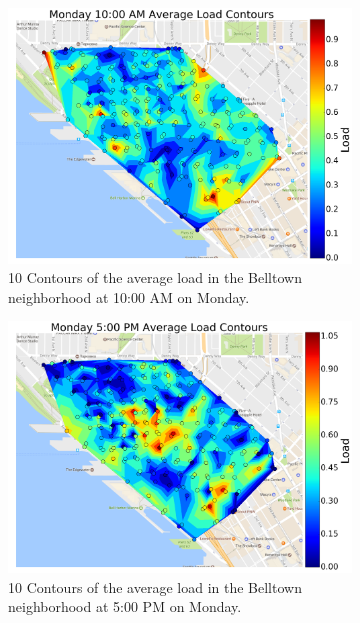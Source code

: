 \documentclass{article}
\begin{document}
\begin{figure}[H]
\begin{subfigure}[t]{0.45\textwidth}
\centering
\includegraphics[width=.99\textwidth]{../figs/monday_10am.png}
\caption{10 Contours of the average load in the Belltown neighborhood at 10:00 AM on Monday.}
\label{fig:subim1}
\end{subfigure}\hfill
\begin{subfigure}[t]{0.45\textwidth}
\centering
\includegraphics[width=.99\textwidth]{../figs/monday_5pm.png}
\caption{10 Contours of the average load in the Belltown neighborhood at 5:00 PM on Monday.}
\label{fig:subim2}
\end{subfigure}
\caption{}
\label{fig:image2}
\end{figure}
\end{document}
